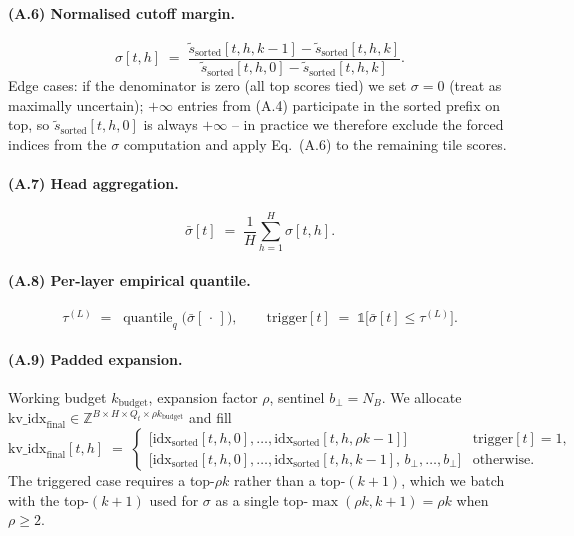 \documentclass[11pt]{article}
\theoremstyle{remark}
\newcommand{\kbudget}{k_{\text{budget}}}
\newcommand{\NB}{N_{\!B}}
\begin{document}
\paragraph{(A.6) Normalised cutoff margin.}
\begin{equation}
\sigma[t,h] \;=\; \frac{\widetilde{s}_{\text{sorted}}[t,h,k{-}1] - \widetilde{s}_{\text{sorted}}[t,h,k]}{\widetilde{s}_{\text{sorted}}[t,h,0] - \widetilde{s}_{\text{sorted}}[t,h,k]}.
\end{equation}
Edge cases: if the denominator is zero (all top scores tied) we set $\sigma = 0$ (treat as maximally uncertain); $+\infty$ entries from (A.4) participate in the sorted prefix on top, so $\widetilde{s}_{\text{sorted}}[t,h,0]$ is always $+\infty$ -- in practice we therefore exclude the forced indices from the $\sigma$ computation and apply Eq.~(A.6) to the remaining tile scores.

\paragraph{(A.7) Head aggregation.}
\begin{equation}
\bar\sigma[t] \;=\; \frac{1}{H}\sum_{h=1}^{H} \sigma[t,h].
\end{equation}

\paragraph{(A.8) Per-layer empirical quantile.}
\begin{equation}
\tau^{(L)} \;=\; \operatorname{quantile}_q\!\bigl(\bar\sigma[\,\cdot\,]\bigr),\qquad
\text{trigger}[t] \;=\; \mathbb{1}\!\bigl[\bar\sigma[t] \le \tau^{(L)}\bigr].
\end{equation}

\paragraph{(A.9) Padded expansion.} Working budget $\kbudget$, expansion factor $\rho$, sentinel $b_\bot = \NB$. We allocate $\text{kv\_idx}_{\text{final}} \in \mathbb{Z}^{B \times H \times Q_t \times \rho\kbudget}$ and fill
\begin{equation}
\text{kv\_idx}_{\text{final}}[t,h] \;=\;
\begin{cases}
\bigl[\text{idx}_{\text{sorted}}[t,h,0],\dots,\text{idx}_{\text{sorted}}[t,h,\rho k {-} 1]\bigr] & \text{trigger}[t]=1, \\[0.25em]
\bigl[\text{idx}_{\text{sorted}}[t,h,0],\dots,\text{idx}_{\text{sorted}}[t,h,k{-}1],\, b_\bot, \dots, b_\bot\bigr] & \text{otherwise.}
\end{cases}
\end{equation}
The triggered case requires a top-$\rho k$ rather than a top-$(k{+}1)$, which we batch with the top-$(k{+}1)$ used for $\sigma$ as a single top-$\max(\rho k, k{+}1) = \rho k$ when $\rho \ge 2$.
\end{document}
